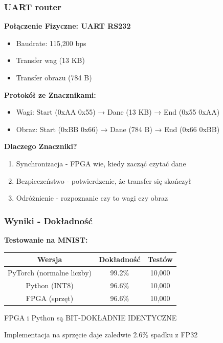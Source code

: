\documentclass{beamer}
\begin{document}
\begin{frame}
  \frametitle{UART router}

  \textbf{Połączenie Fizyczne: UART RS232}
  \begin{itemize}
    \item Baudrate: 115,200 bps
    \item Transfer wag (13 KB)
    \item Transfer obrazu (784 B)
  \end{itemize}

  \vspace{0.3cm}

  \textbf{Protokół ze Znacznikami:}
  \begin{itemize}
    \item Wagi: Start (0xAA 0x55) → Dane (13 KB) → End (0x55 0xAA)
    \item Obraz: Start (0xBB 0x66) → Dane (784 B) → End (0x66 0xBB)
  \end{itemize}

  \vspace{0.3cm}

  \textbf{Dlaczego Znaczniki?}
  \begin{enumerate}
    \item Synchronizacja - FPGA wie, kiedy zacząć czytać dane
    \item Bezpieczeństwo - potwierdzenie, że transfer się skończył
    \item Odróżnienie - rozpoznanie czy to wagi czy obraz
  \end{enumerate}
\end{frame}

\begin{frame}
  \frametitle{Wyniki - Dokładność}

  \textbf{Testowanie na MNIST:}

  \vspace{0.3cm}

  \begin{center}
    \begin{tabular}{|c|c|c|}
      \hline
      \textbf{Wersja} & \textbf{Dokładność} & \textbf{Testów} \\
      \hline
      PyTorch (normalne liczby) & 99.2\% & 10,000 \\
      \hline
      Python (INT8) & 96.6\% & 10,000 \\
      \hline
      FPGA (sprzęt) & 96.6\% & 10,000 \\
      \hline
    \end{tabular}
  \end{center}

  \vspace{0.5cm}

  FPGA i Python są BIT-DOKŁADNIE IDENTYCZNE

  \vspace{0.3cm}

  Implementacja na sprzęcie daje zaledwie 2.6\% spadku z FP32 

\end{frame}
\end{document}
